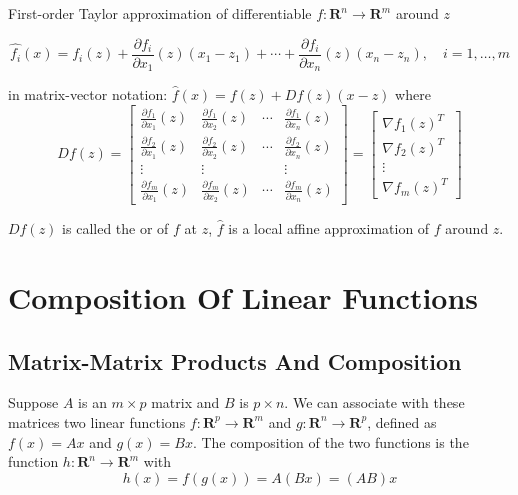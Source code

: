 \begin{theorem}
    First-order Taylor approximation of differentiable $ f: \mathbf{R}^{n} \rightarrow \mathbf{R}^{m} $ around $ z $

$$
\hat{f_{i}}(x)=f_{i}(z)+\frac{\partial f_{i}}{\partial x_{1}}(z)\left(x_{1}-z_{1}\right)+\cdots+\frac{\partial f_{i}}{\partial x_{n}}(z)\left(x_{n}-z_{n}\right), \quad i=1, \ldots, m
$$

in matrix-vector notation: $ \hat{f}(x)=f(z)+D f(z)(x-z) $ where
$$
D f(z)=\left[\begin{array}{cccc}
\frac{\partial f_{1}}{\partial x_{1}}(z) & \frac{\partial f_{1}}{\partial x_{2}}(z) & \cdots & \frac{\partial f_{1}}{\partial x_{n}}(z) \\
\frac{\partial f_{2}}{\partial x_{1}}(z) & \frac{\partial f_{2}}{\partial x_{2}}(z) & \cdots & \frac{\partial f_{2}}{\partial x_{n}}(z) \\
\vdots & \vdots & & \vdots \\
\frac{\partial f_{m}}{\partial x_{1}}(z) & \frac{\partial f_{m}}{\partial x_{2}}(z) & \cdots & \frac{\partial f_{m}}{\partial x_{n}}(z)
\end{array}\right]=\left[\begin{array}{c}
\nabla f_{1}(z)^{T} \\
\nabla f_{2}(z)^{T} \\
\vdots \\
\nabla f_{m}(z)^{T}
\end{array}\right]
$$

$ D f(z) $ is called the  or  of $ f $ at $ z $, $ \hat{f} $ is a local affine approximation of $ f $ around $ z $.
\end{theorem}

\section{Composition Of Linear Functions}

\subsection{Matrix-Matrix Products And Composition}

Suppose $ A $ is an $ m \times p $ matrix and $ B $ is $ p \times n $. We can associate with these matrices two linear functions $ f: \mathbf{R}^{p} \rightarrow \mathbf{R}^{m} $ and $ g: \mathbf{R}^{n} \rightarrow \mathbf{R}^{p} $, defined as $ f(x)=A x $ and $ g(x)=B x $. The composition of the two functions is the function $ h: \mathbf{R}^{n} \rightarrow \mathbf{R}^{m} $ with
$$
h(x)=f(g(x))=A(B x)=(A B) x
$$

